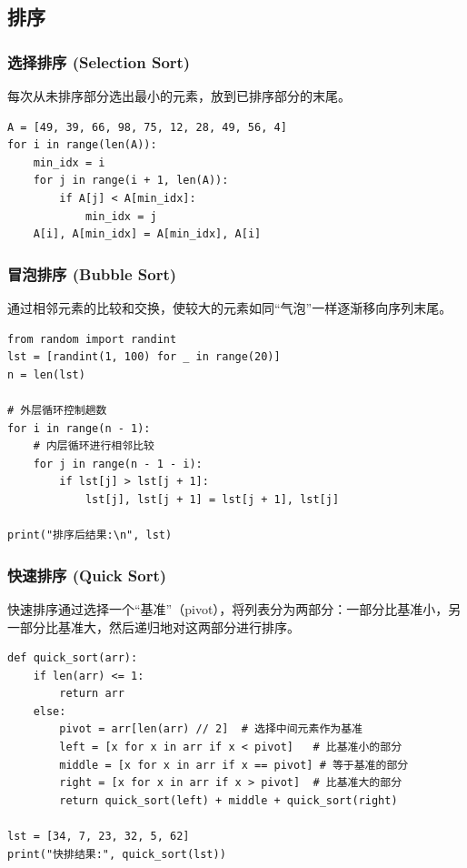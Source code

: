 \documentclass{article}
\begin{document}
\subsection{排序}

\subsubsection{选择排序 (Selection Sort)}
每次从未排序部分选出最小的元素，放到已排序部分的末尾。
\begin{lstlisting}
A = [49, 39, 66, 98, 75, 12, 28, 49, 56, 4]
for i in range(len(A)):
    min_idx = i
    for j in range(i + 1, len(A)):
        if A[j] < A[min_idx]:
            min_idx = j
    A[i], A[min_idx] = A[min_idx], A[i]
\end{lstlisting}

\subsubsection{冒泡排序 (Bubble Sort)}
通过相邻元素的比较和交换，使较大的元素如同“气泡”一样逐渐移向序列末尾。
\begin{lstlisting}[caption=冒泡排序代码]
from random import randint
lst = [randint(1, 100) for _ in range(20)]
n = len(lst)

# 外层循环控制趟数
for i in range(n - 1):
    # 内层循环进行相邻比较
    for j in range(n - 1 - i):
        if lst[j] > lst[j + 1]:
            lst[j], lst[j + 1] = lst[j + 1], lst[j]

print("排序后结果:\n", lst)
\end{lstlisting}

\subsubsection{快速排序 (Quick Sort)}
快速排序通过选择一个“基准”（pivot），将列表分为两部分：一部分比基准小，另一部分比基准大，然后递归地对这两部分进行排序。



\begin{lstlisting}[caption=快速排序代码 (递归版)]
def quick_sort(arr):
    if len(arr) <= 1:
        return arr
    else:
        pivot = arr[len(arr) // 2]  # 选择中间元素作为基准
        left = [x for x in arr if x < pivot]   # 比基准小的部分
        middle = [x for x in arr if x == pivot] # 等于基准的部分
        right = [x for x in arr if x > pivot]  # 比基准大的部分
        return quick_sort(left) + middle + quick_sort(right)

lst = [34, 7, 23, 32, 5, 62]
print("快排结果:", quick_sort(lst))
\end{lstlisting}
\end{document}
